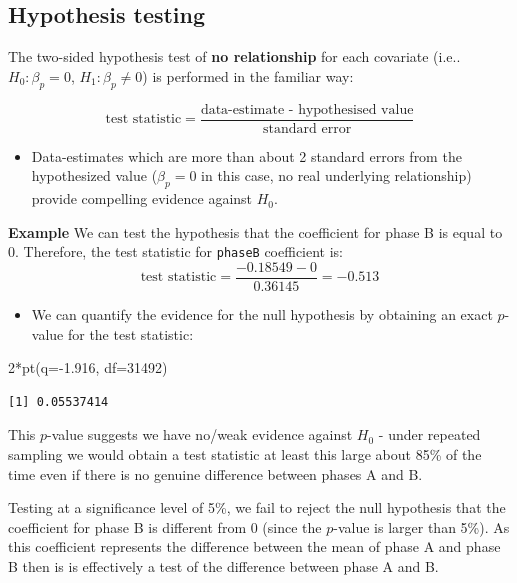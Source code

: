 \documentclass[
  oneside]{krantz}
\newenvironment{Shaded}{\begin{snugshade}}{\end{snugshade}}
\newcommand{\AttributeTok}[1]{\textcolor[rgb]{0.77,0.63,0.00}{#1}}
\newcommand{\DecValTok}[1]{\textcolor[rgb]{0.00,0.00,0.81}{#1}}
\newcommand{\FloatTok}[1]{\textcolor[rgb]{0.00,0.00,0.81}{#1}}
\newcommand{\FunctionTok}[1]{\textcolor[rgb]{0.00,0.00,0.00}{#1}}
\newcommand{\NormalTok}[1]{#1}
\newcommand{\SpecialCharTok}[1]{\textcolor[rgb]{0.00,0.00,0.00}{#1}}
\providecommand{\tightlist}{%
  \setlength{\itemsep}{0pt}\setlength{\parskip}{0pt}}
\begin{document}
\hypertarget{hypothesis-testing}{%
\subsection{Hypothesis testing}\label{hypothesis-testing}}

The two-sided hypothesis test of \textbf{no relationship} for each covariate (i.e.. \(H_0: \beta_p=0\), \(H_1: \beta_p \neq 0\)) is performed in the familiar way:

\[
\textrm{test statistic} = \frac{\textrm{data-estimate - hypothesised value}}{ {\textrm{standard error}}}
\]

\begin{itemize}
\tightlist
\item
  Data-estimates which are more than about 2 standard errors from the hypothesized value
  (\(\beta_p=0\) in this case, no real underlying relationship) provide compelling evidence against \(H_0\).
\end{itemize}

\textbf{Example} We can test the hypothesis that the coefficient for phase B is equal to 0. Therefore, the test statistic for \texttt{phaseB} coefficient is:
\[
\textrm{test statistic} = \frac{-0.18549-0}{0.36145}=-0.513
\]

\begin{itemize}
\tightlist
\item
  We can quantify the evidence for the null hypothesis by obtaining an exact \(p\)-value for the test statistic:
\end{itemize}

\begin{Shaded}
\begin{Highlighting}[]
\DecValTok{2}\SpecialCharTok{*}\FunctionTok{pt}\NormalTok{(}\AttributeTok{q=}\SpecialCharTok{{-}}\FloatTok{1.916}\NormalTok{, }\AttributeTok{df=}\DecValTok{31492}\NormalTok{)}
\end{Highlighting}
\end{Shaded}

\begin{verbatim}
[1] 0.05537414
\end{verbatim}

This \(p\)-value suggests we have no/weak evidence against \(H_0\) - under repeated sampling we would obtain a test statistic at least this large about 85\% of the time even if there is no genuine difference between phases A and B.

Testing at a significance level of 5\%, we fail to reject the null hypothesis that the coefficient for phase B is different from 0 (since the \(p\)-value is larger than 5\%). As this coefficient represents the difference between the mean of phase A and phase B then is is effectively a test of the difference between phase A and B.
\end{document}
